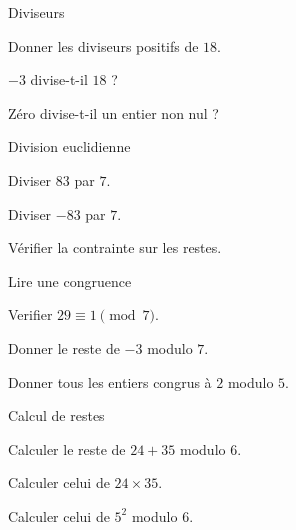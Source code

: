 \exercices
{}
\begingroup\renewcommand{\otBesoinPlace}[1]{}\begin{minipage}{\linewidth}
\begin{exercice}[1]{Diviseurs}

\begin{questions}
\item Donner les diviseurs positifs de $18$.
\item $-3$ divise-t-il $18$ ?
\item Zéro divise-t-il un entier non nul ?
\end{questions}
\end{exercice}
\begin{exercice}[1]{Division euclidienne}

\begin{questions}
\item Diviser $83$ par $7$.
\item Diviser $-83$ par $7$.
\item Vérifier la contrainte sur les restes.
\end{questions}
\end{exercice}
\begin{exercice}[1]{Lire une congruence}

\begin{questions}
\item Verifier $29\equiv1\pmod7$.
\item Donner le reste de $-3$ modulo $7$.
\item Donner tous les entiers congrus à $2$ modulo $5$.
\end{questions}
\end{exercice}
\begin{exercice}[1]{Calcul de restes}

\begin{questions}
\item Calculer le reste de $24+35$ modulo $6$.
\item Calculer celui de $24\times35$.
\item Calculer celui de $5^2$ modulo $6$.
\end{questions}
\end{exercice}
\end{minipage}\endgroup
\clearpage
{}
